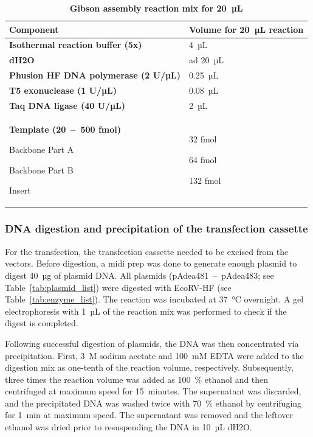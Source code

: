 \begin{table}[H]
        \caption{\textbf{Gibson assembly reaction mix for 20~µL}}
        \label{tab:gibson_mix}
        \begin{tabular}{|L{10cm}|Y{4.5cm}|}
          \hline
           \textbf{Component}   & \textbf{Volume for 20~µL reaction} \\ 
            \hline
            \textbf{Isothermal reaction buffer (5x)} & 4~µL \\
            \textbf{\gls{dH2O}} & ad 20~µL \\
            \textbf{Phusion HF DNA polymerase (2 U/µL)} & 0.25~µL \\
            \textbf{T5 exonuclease	(1 U/µL)} & 0.08~µL \\
            \textbf{Taq DNA ligase	(40	U/µL)} & 2~µL \\
            \textbf{Template (20~--~500 fmol)}    
            \par Backbone Part A \par Backbone Part B \par Insert  & 
            \quad \par 32 fmol    \par  64 fmol      \par 132 fmol \\
            \hline
        \end{tabular}
    \end{table} 
\subsubsection{DNA digestion and precipitation of the transfection cassette} \label{txt:Digest_and_precipitation}
For the transfection, the transfection cassette needed to be excised from the vectors. Before digestion, a midi prep was done to generate enough plasmid to digest 40~µg of plasmid DNA. All plasmids (pAdea481~--~pAdea483; see Table~\ref{tab:plasmid_list}) were digested with EcoRV-HF (see Table~\ref{tab:enzyme_list}). The reaction was incubated at 37~°C overnight. A gel electrophoresis with 1~µL of the reaction mix was performed to check if the digest is completed. 

\par Following successful digestion of plasmids, the DNA was then concentrated via precipitation. First, 3~M sodium acetate and 100~mM EDTA were added to the digestion mix as one-tenth of the reaction volume, respectively. Subsequently, three times the reaction volume was added as 100~\% ethanol and then centrifuged at maximum speed for 15~minutes. The supernatant was discarded, and the precipitated DNA was washed twice with 70~\% ethanol by centrifuging for 1~min at maximum speed. The supernatant was removed and the leftover ethanol was dried prior to resuspending the DNA in 10~µL \gls{dH2O}. 

